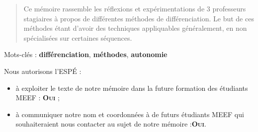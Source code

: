 \begin{abstract}
Ce mémoire rassemble les réflexions et expérimentations de 3 professeurs stagiaires
à propos de différentes méthodes de différenciation. Le but de ces méthodes
étant d'avoir des techniques appliquables généralement, en non spécialisées sur
certaines séquences.
\end{abstract}

Mots-clés : \textbf{différenciation}, \textbf{méthodes}, \textbf{autonomie}

\vfill

Nous autorisons l'ESPÉ :
\begin{itemize}
\item à exploiter le texte de notre mémoire dans la future formation des étudiants MEEF : \textbf{\textsc{Oui}} ;
\item à communiquer notre nom et coordonnées à de futurs étudiants MEEF qui souhaiteraient nous contacter au sujet de notre mémoire :\textbf{\textsc{Oui}}.
\end{itemize}
